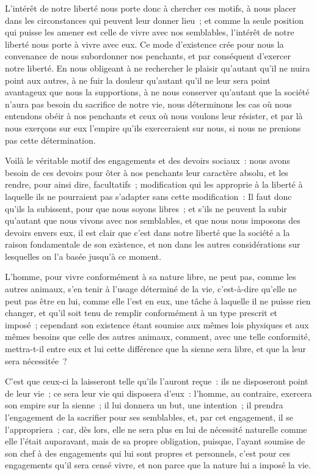 \documentclass[french,twoside]{book} %
\begin{document}
L’intérêt de notre liberté nous porte donc à chercher ces motifs, à nous placer dans les circonstances qui peuvent leur donner lieu ; et comme la seule position qui puisse les amener est celle de vivre avec nos semblables, l’intérêt de notre liberté nous porte à vivre avec eux. Ce mode d’existence crée pour nous la convenance de nous subordonner nos penchants, et par conséquent d’exercer notre liberté. En nous obligeant à ne rechercher le plaisir qu’autant qu’il ne nuira point aux autres, à ne fuir la douleur qu’autant qu’il ne leur sera point avantageux que nous la supportions, à ne nous conserver qu’autant que la société n’aura pas besoin du sacrifice de notre vie, nous déterminons les cas où nous entendons obéir à nos penchants et ceux où nous voulons leur résister, et par là nous exerçons sur eux l’empire qu’ils exerceraient sur nous, si nous ne prenions pas cette détermination.\par
Voilà le véritable motif des engagements et des devoirs sociaux : nous avons besoin de ces devoirs pour ôter à nos penchants leur caractère absolu, et les rendre, pour ainsi dire, facultatifs ; modification qui les approprie à la liberté à laquelle ils ne pourraient pas s’adapter sans cette modification : Il faut donc qu’ils la subissent, pour que nous soyons libres ; et s’ils ne peuvent la subir qu’autant que nous vivons avec nos semblables, et que nous nous imposons des devoirs envers eux, il est clair que c’est dans notre liberté que la société a la raison fondamentale de son existence, et non dans les autres considérations sur lesquelles on l’a basée jusqu’à ce moment.\par
L’homme, pour vivre conformément à sa nature libre, ne peut pas, comme les autres animaux, s’en tenir à l’usage déterminé de la vie, c’est-à-dire qu’elle ne peut pas être en lui, comme elle l’est en eux, une tâche à laquelle il ne puisse rien changer, et qu’il soit tenu de remplir conformément à un type prescrit et imposé ; cependant son existence étant soumise aux mêmes lois physiques et aux mêmes besoins que celle des autres animaux, comment, avec une telle conformité, mettra-t-il entre eux et lui cette différence que la sienne sera libre, et que la leur sera nécessitée ?\par
C’est que ceux-ci la laisseront telle qu’ils l’auront reçue : ils ne disposeront point de leur vie ; ce sera leur vie qui disposera d’eux : l’homme, au contraire, exercera son empire sur la sienne ; il lui donnera un but, une intention ; il prendra l’engagement de la sacrifier pour ses semblables, et, par cet engagement, il se l’appropriera ; car, dès lors, elle ne sera plus en lui de nécessité naturelle comme elle l’était auparavant, mais de sa propre obligation, puisque, l’ayant soumise de son chef à des engagements qui lui sont propres et personnels, c’est pour ces engagements qu’il sera censé vivre, et non parce que la nature lui a imposé la vie.\par
\end{document}
